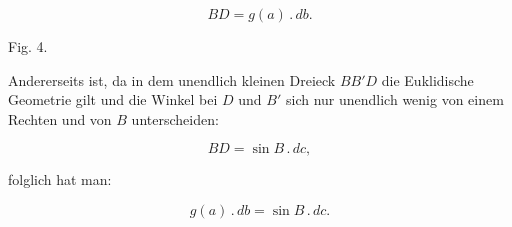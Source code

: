 \[
BD = g(a)\,.\,db.
\]

\begin{center}\begin{minipage}{\linewidth}\centering


Fig. 4.
\end{minipage}\end{center}

\noindent Andererseits ist, da in dem unendlich kleinen Dreieck $BB'D$ die Euklidische Geometrie gilt und die Winkel bei $D$ und $B'$ sich nur unendlich wenig von einem Rechten und von $B$ unterscheiden:

\[
BD = \sin B\,.\,dc,
\]

\noindent folglich hat man:

\[
\tag*{1)} g(a)\,.\,db = \sin B\,.\,dc.
\]

